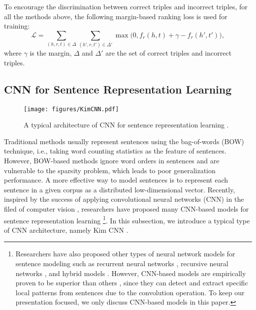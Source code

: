 \documentclass[sigconf]{acmart}
\begin{document}
		To encourage the discrimination between correct triples and incorrect triples, for all the methods above, the following margin-based ranking loss is used for training:
		\begin{equation}
			\mathcal L = \sum_{(h, r, t) \in \Delta} \sum_{(h', r, t') \in \Delta'} \max \big( 0, f_r(h, t) + \gamma - f_r(h', t') \big),
		\end{equation}
		where $\gamma$ is the margin, $\Delta$ and $\Delta'$ are the set of correct triples and incorrect triples.
		
		
	\subsection{CNN for Sentence Representation Learning}
	\label{sec:cnn_srl}
		\begin{figure}[t]
			\centering
  			\texttt{[image: figures/KimCNN.pdf]}
  			\caption{A typical architecture of CNN for sentence representation learning \cite{kim2014convolutional}.}
  			\label{fig:kim_cnn}
		\end{figure}
		
		Traditional methods \cite{agarwal2009regression, wang2017joint} usually represent sentences using the bag-of-words (BOW) technique, i.e., taking word counting statistics as the feature of sentences.
		However, BOW-based methods ignore word orders in sentences and are vulnerable to the sparsity problem, which leads to poor generalization performance.
		A more effective way to model sentences is to represent each sentence in a given corpus as a distributed low-dimensional vector.
		Recently, inspired by the success of applying convolutional neural networks (CNN) in the filed of computer vision \cite{krizhevsky2012imagenet}, researchers have proposed many CNN-based models for sentence representation learning \cite{kim2014convolutional, kalchbrenner2014convolutional, zhang2015character, conneau2016very} \footnote{Researchers have also proposed other types of neural network models for sentence modeling such as recurrent neural networks \cite{tai2015improved}, recursive neural networks \cite{socher2013recursive}, and hybrid models \cite{lai2015recurrent}. However, CNN-based models are empirically proven to be superior than others \cite{hong2015sentiment}, since they can detect and extract specific local patterns from sentences due to the convolution operation. To keep our presentation focused, we only discuss CNN-based models in this paper.}.
		In this subsection, we introduce a typical type of CNN architecture, namely Kim CNN \cite{kim2014convolutional}.
		
\end{document}
